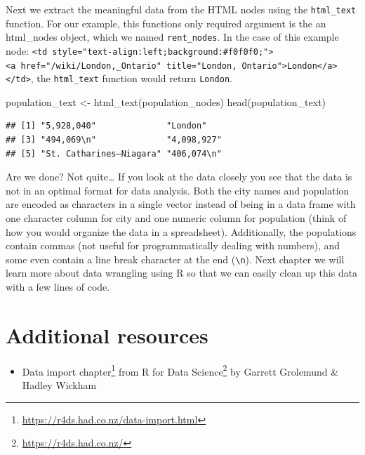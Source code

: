 \documentclass[
]{krantz}
\makeatletter
\newenvironment{Shaded}{\begin{snugshade}}{\end{snugshade}}
\newcommand{\FunctionTok}[1]{\textcolor[rgb]{0,0,0}{#1}}
\newcommand{\NormalTok}[1]{#1}
\newcommand{\OtherTok}[1]{\textcolor[rgb]{0.37,0.37,0.37}{#1}}
\providecommand{\tightlist}{%
  \setlength{\itemsep}{0pt}\setlength{\parskip}{0pt}}
\renewcommand{\href}[2]{#2\footnote{\url{#1}}}
\newenvironment{kframe}{%
\medskip{}
\setlength{\fboxsep}{.8em}
 \def\at@end@of@kframe{}%
 \ifinner\ifhmode%
  \def\at@end@of@kframe{\end{minipage}}%
  \begin{minipage}{\columnwidth}%
 \fi\fi%
 \def\FrameCommand##1{\hskip\@totalleftmargin \hskip-\fboxsep
 \colorbox{shadecolor}{##1}\hskip-\fboxsep
     \hskip-\linewidth \hskip-\@totalleftmargin \hskip\columnwidth}%
 \MakeFramed {\advance\hsize-\width
   \@totalleftmargin\z@ \linewidth\hsize
   \@setminipage}}%
 {\par\unskip\endMakeFramed%
 \at@end@of@kframe}
\renewenvironment{Shaded}{\begin{kframe}}{\end{kframe}}
\makeatother
\begin{document}
Next we extract the meaningful data from the HTML nodes using the \texttt{html\_text} function. For our example, this functions only required argument is the an html\_nodes object, which we named \texttt{rent\_nodes}. In the case of this example node: \texttt{\textless{}td\ style="text-align:left;background:\#f0f0f0;"\textgreater{}\textless{}a\ href="/wiki/London,\_Ontario"\ title="London,\ Ontario"\textgreater{}London\textless{}/a\textgreater{}\textless{}/td\textgreater{}}, the \texttt{html\_text} function would return \texttt{London}.

\begin{Shaded}
\begin{Highlighting}[]
\NormalTok{population\_text }\OtherTok{\textless{}{-}} \FunctionTok{html\_text}\NormalTok{(population\_nodes)}
\FunctionTok{head}\NormalTok{(population\_text)}
\end{Highlighting}
\end{Shaded}

\begin{verbatim}
## [1] "5,928,040"              "London"                
## [3] "494,069\n"              "4,098,927"             
## [5] "St. Catharines–Niagara" "406,074\n"
\end{verbatim}

Are we done? Not quite\ldots{} If you look at the data closely you see that the data is not in an optimal format for data analysis. Both the city names and population are encoded as characters in a single vector instead of being in a data frame with one character column for city and one numeric column for population (think of how you would organize the data in a spreadsheet). Additionally, the populations contain commas (not useful for programmatically dealing with numbers), and some even contain a line break character at the end (\texttt{\textbackslash{}n}). Next chapter we will learn more about data wrangling using R so that we can easily clean up this data with a few lines of code.

\hypertarget{additional-resources}{%
\section{Additional resources}\label{additional-resources}}

\begin{itemize}
\tightlist
\item
  \href{https://r4ds.had.co.nz/data-import.html}{Data import chapter} from \href{https://r4ds.had.co.nz/}{R for Data Science} by Garrett Grolemund \& Hadley Wickham
\end{itemize}
\end{document}
